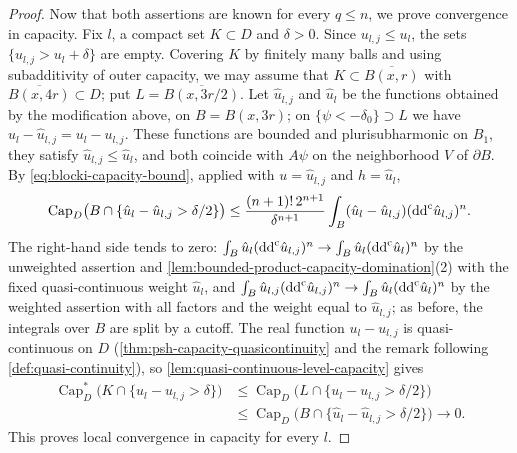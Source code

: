 \begin{proof}
Now that both assertions are known for every $q\le n$, we prove convergence in capacity. Fix $l$, a compact set $K\subset D$ and $\delta>0$. Since $u_{l,j}\le u_l$, the sets $\{u_{l,j}>u_l+\delta\}$ are empty. Covering $K$ by finitely many balls and using subadditivity of outer capacity, we may assume that $K\subset\overline{B(x,r)}$ with $\overline{B(x,4r)}\subset D$; put $L=\overline{B(x,3r/2)}$. Let $\hat u_{l,j}$ and $\hat u_l$ be the functions obtained by the modification above, on $B=B(x,3r)$; on $\{\psi<-\delta_0\}\supset L$ we have $\hat u_l-\hat u_{l,j}=u_l-u_{l,j}$. These functions are bounded and plurisubharmonic on $B_1$, they satisfy $\hat u_{l,j}\le\hat u_l$, and both coincide with $A\psi$ on the neighborhood $V$ of $\partial B$. By \eqref{eq:blocki-capacity-bound}, applied with $u=\hat u_{l,j}$ and $h=\hat u_l$,
\[
 \operatorname{Cap}_D\bigl(B\cap\{\hat u_l-\hat u_{l,j}>\delta/2\}\bigr)\le\frac{(n+1)!\,2^{n+1}}{\delta^{n+1}}\int_B(\hat u_l-\hat u_{l,j})(\mathrm{dd}^{\mathrm{c}}\hat u_{l,j})^n.
\]
The right-hand side tends to zero: $\int_B\hat u_l(\mathrm{dd}^{\mathrm{c}}\hat u_{l,j})^n\to\int_B\hat u_l(\mathrm{dd}^{\mathrm{c}}\hat u_l)^n$ by the unweighted assertion and \cref{lem:bounded-product-capacity-domination}(2) with the fixed quasi-continuous weight $\hat u_l$, and $\int_B\hat u_{l,j}(\mathrm{dd}^{\mathrm{c}}\hat u_{l,j})^n\to\int_B\hat u_l(\mathrm{dd}^{\mathrm{c}}\hat u_l)^n$ by the weighted assertion with all factors and the weight equal to $\hat u_{l,j}$; as before, the integrals over $B$ are split by a cutoff. The real function $u_l-u_{l,j}$ is quasi-continuous on $D$ (\cref{thm:psh-capacity-quasicontinuity} and the remark following \cref{def:quasi-continuity}), so \cref{lem:quasi-continuous-level-capacity} gives
\[
 \begin{aligned}
 \operatorname{Cap}^*_D\bigl(K\cap\{u_l-u_{l,j}>\delta\}\bigr)&\le\operatorname{Cap}_D\bigl(L\cap\{u_l-u_{l,j}>\delta/2\}\bigr)\\
 &\le\operatorname{Cap}_D\bigl(B\cap\{\hat u_l-\hat u_{l,j}>\delta/2\}\bigr)\longrightarrow0.
 \end{aligned}
\]
This proves local convergence in capacity for every $l$.
\end{proof}


